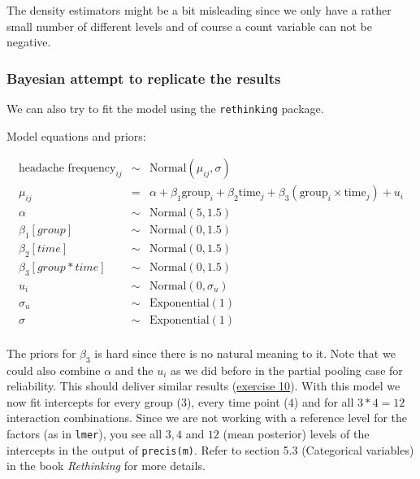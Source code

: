 \documentclass[
]{book}
\begin{document}
The density estimators might be a bit misleading since we only have a rather small
number of different levels and of course a count variable can not be negative.

\subsubsection{Bayesian attempt to replicate the results}\label{mulligan_bayesian}

We can also try to fit the model using the \texttt{rethinking} package.

Model equations and priors:

\[
\begin{array}{rcl}
\text{headache frequency}_{ij} &\sim& \text{Normal}(\mu_{ij}, \sigma) \\
\mu_{ij} &=& \alpha + \beta_1 \text{group}_i + \beta_2 \text{time}_j + 
              \beta_3 (\text{group}_i \times \text{time}_j) + u_i\\
\alpha &\sim& \text{Normal}(5, 1.5) \\
\beta_1[group] &\sim& \text{Normal}(0, 1.5) \\
\beta_2[time] &\sim& \text{Normal}(0, 1.5) \\
\beta_3[group*time] &\sim& \text{Normal}(0, 1.5) \\ 
u_i &\sim& \text{Normal}(0, \sigma_u) \\
\sigma_u &\sim& \text{Exponential}(1) \\
\sigma &\sim& \text{Exponential}(1) \\
\end{array}
\]

The priors for \(\beta_3\) is hard since there is no natural meaning to it.
Note that we could also combine \(\alpha\) and the \(u_i\) as we did before in the
partial pooling case for reliability. This should deliver similar results
(\hyperref[exercise10_LMM]{exercise 10}).
With this model we now fit intercepts for every group (\(3\)),
every time point (\(4\)) and for all \(3*4=12\) interaction combinations.
Since we are not working with a reference level for the factors (as in \texttt{lmer}), you see
all \(3,4\) and \(12\) (mean posterior) levels of the intercepts in the output of \texttt{precis(m)}.
Refer to section 5.3 (Categorical variables) in the book \emph{Rethinking} for more details.
\end{document}
